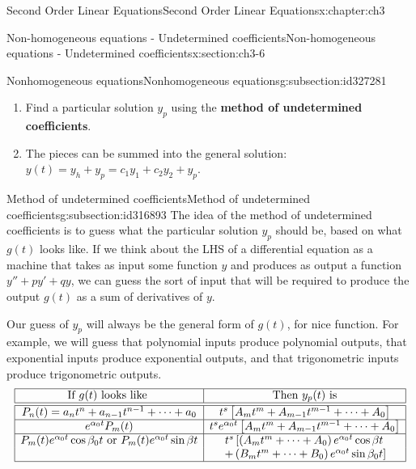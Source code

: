 \documentclass[oneside,10pt,]{book}
\newcommand{\terminology}[1]{\textbf{#1}}
\numberwithin{equation}{section}
\numberwithin{equation}{section}
\newcommand{\amp}{&}
\begin{document}
\begin{chapterptx}{Second Order Linear Equations}{}{Second Order Linear Equations}{}{}{x:chapter:ch3}
\begin{sectionptx}{Non-homogeneous equations - Undetermined coefficients}{}{Non-homogeneous equations - Undetermined coefficients}{}{}{x:section:ch3-6}
\begin{subsectionptx}{Nonhomogeneous equations}{}{Nonhomogeneous equations}{}{}{g:subsection:id327281}
\begin{enumerate}
\item{}Find a particular solution \(y_{p}\) using the \terminology{method of undetermined coefficients}.%
\item{}The pieces can be summed into the general solution: \(y(t)=y_{h}+y_{p}=c_{1}y_{1}+c_{2}y_{2}+y_{p}\).%
\end{enumerate}
%
\end{subsectionptx}
%
%
\typeout{************************************************}
\typeout{************************************************}
%
\begin{subsectionptx}{Method of undetermined coefficients}{}{Method of undetermined coefficients}{}{}{g:subsection:id316893}
The idea of the method of undetermined coefficients is to guess what the particular solution \(y_{p}\) should be, based on what \(g(t)\) looks like. If we think about the LHS of a differential equation as a machine that takes as input some function \(y\) and produces as output a function \(y'' + py' + qy\), we can guess the sort of input that will be required to produce the output \(g(t)\) as a sum of derivatives of \(y\).%
\par
Our guess of \(y_{p}\) will always be the general form of \(g(t)\), for nice function. For example, we will guess that polynomial inputs produce polynomial outputs, that exponential inputs produce exponential outputs, and that trigonometric inputs produce trigonometric outputs.%
\begin{equation*}
\begin{array}{|c|c|}
\hline
\text{If } g(t) \text{ looks like }  \amp \text{Then } y_{p}(t) \text{ is}\\
\hline
\hline
P_{n}(t)=a_{n}t^{n}+a_{n-1}t^{n-1}+\cdots+a_{0} \amp t^{s}\left[A_{m}t^{m}+A_{m-1}t^{m-1}+\cdots+A_{0}\right]\\
\hline
e^{\alpha_0 t}P_{m}(t) \amp t^{s}e^{\alpha_0 t}\left[A_{m}t^{m}+A_{m-1}t^{m-1}+\cdots+A_{0}\right]\\
\hline
P_{m}(t)e^{\alpha_0 t}\cos\beta_0 t \text{ or } P_{m}(t)e^{\alpha_0 t}\sin\beta t \amp t^{s}\left[\left(A_{m}t^{m}+\cdots+A_{0}\right)e^{\alpha_0 t}\cos\beta t\right. \\
\amp \left.+\left(B_{m}t^{m}+\cdots+B_{0}\right)e^{\alpha_0 t}\sin\beta_0 t\right]\\
\hline
\end{array}
\end{equation*}

\end{subsectionptx}
\end{sectionptx}
\end{chapterptx}
\end{document}

